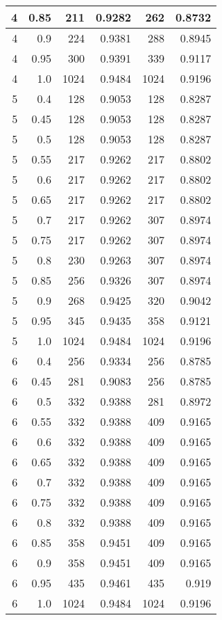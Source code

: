 \begin{center}
\begin{longtable}{|r|r|r|r|r|r|}
\hline
4 & 0.85 & 211 & 0.9282 & 262 & 0.8732 \\
\hline
4 & 0.9 & 224 & 0.9381 & 288 & 0.8945 \\
\hline
4 & 0.95 & 300 & 0.9391 & 339 & 0.9117 \\
\hline
4 & 1.0 & 1024 & 0.9484 & 1024 & 0.9196 \\
\hline
5 & 0.4 & 128 & 0.9053 & 128 & 0.8287 \\
\hline
5 & 0.45 & 128 & 0.9053 & 128 & 0.8287 \\
\hline
5 & 0.5 & 128 & 0.9053 & 128 & 0.8287 \\
\hline
5 & 0.55 & 217 & 0.9262 & 217 & 0.8802 \\
\hline
5 & 0.6 & 217 & 0.9262 & 217 & 0.8802 \\
\hline
5 & 0.65 & 217 & 0.9262 & 217 & 0.8802 \\
\hline
5 & 0.7 & 217 & 0.9262 & 307 & 0.8974 \\
\hline
5 & 0.75 & 217 & 0.9262 & 307 & 0.8974 \\
\hline
5 & 0.8 & 230 & 0.9263 & 307 & 0.8974 \\
\hline
5 & 0.85 & 256 & 0.9326 & 307 & 0.8974 \\
\hline
5 & 0.9 & 268 & 0.9425 & 320 & 0.9042 \\
\hline
5 & 0.95 & 345 & 0.9435 & 358 & 0.9121 \\
\hline
5 & 1.0 & 1024 & 0.9484 & 1024 & 0.9196 \\
\hline
6 & 0.4 & 256 & 0.9334 & 256 & 0.8785 \\
\hline
6 & 0.45 & 281 & 0.9083 & 256 & 0.8785 \\
\hline
6 & 0.5 & 332 & 0.9388 & 281 & 0.8972 \\
\hline
6 & 0.55 & 332 & 0.9388 & 409 & 0.9165 \\
\hline
6 & 0.6 & 332 & 0.9388 & 409 & 0.9165 \\
\hline
6 & 0.65 & 332 & 0.9388 & 409 & 0.9165 \\
\hline
6 & 0.7 & 332 & 0.9388 & 409 & 0.9165 \\
\hline
6 & 0.75 & 332 & 0.9388 & 409 & 0.9165 \\
\hline
6 & 0.8 & 332 & 0.9388 & 409 & 0.9165 \\
\hline
6 & 0.85 & 358 & 0.9451 & 409 & 0.9165 \\
\hline
6 & 0.9 & 358 & 0.9451 & 409 & 0.9165 \\
\hline
6 & 0.95 & 435 & 0.9461 & 435 & 0.919 \\
\hline
6 & 1.0 & 1024 & 0.9484 & 1024 & 0.9196 \\

\end{longtable}
\end{center}
